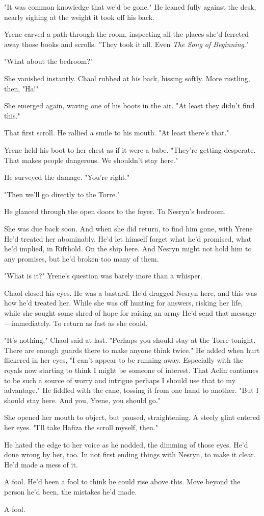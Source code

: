 "It was common knowledge that we'd be gone." He leaned fully against the desk, nearly sighing at the weight it took off his back.

Yrene carved a path through the room, inspecting all the places she'd ferreted away those books and scrolls. "They took it all. Even
\emph{The Song of Beginning}."

"What about the bedroom?"

She vanished instantly. Chaol rubbed at his back, hissing softly. More rustling, then, "Ha!"

She emerged again, waving one of his boots in the air. "At least they didn't find this."

That first scroll. He rallied a smile to his mouth. "At least there's that."

Yrene held his boot to her chest as if it were a babe. "They're getting desperate. That makes people dangerous. We shouldn't stay here."

He surveyed the damage. "You're right."

"Then we'll go directly to the Torre."

He glanced through the open doors to the foyer. To Nesryn's bedroom.

She was due back soon. And when she did return, to find him gone, with Yrene  He'd treated her abominably. He'd let himself forget what he'd promised, what he'd implied, in Rifthold. On the ship here. And Nesryn might not hold him to any promises, but he'd broken too many of them.

"What is it?" Yrene's question was barely more than a whisper.

Chaol closed his eyes. He was a bastard. He'd dragged Nesryn here, and this was how he'd treated her. While she was off hunting for answers, risking her life, while she sought some shred of hope for raising an army  He'd send that message---immediately. To return as fast as she could.

"It's nothing," Chaol said at last. "Perhaps you should stay at the Torre tonight. There are enough guards there to make anyone think twice." He added when hurt flickered in her eyes, "I can't appear to be running away. Especially with the royals now starting to think I might be someone of interest. That Aelin continues to be such a source of worry and intrigue  perhaps I should use that to my advantage." He fiddled with the cane, tossing it from one hand to another. "But I should stay here. And you, Yrene, you should go."

She opened her mouth to object, but paused, straightening. A steely glint entered her eyes. "I'll take Hafiza the scroll myself, then."

He hated the edge to her voice as he nodded, the dimming of those eyes. He'd done wrong by her, too. In not first ending things with Nesryn, to make it clear. He'd made a mess of it.

A fool. He'd been a fool to think he could rise above this. Move beyond the person he'd been, the mistakes he'd made.

A fool.

